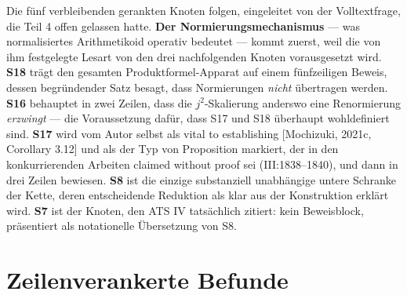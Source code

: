\documentclass[11pt,a4paper]{article}
\theoremstyle{definition}
\theoremstyle{remark}
\begin{document}
Die fünf verbleibenden gerankten Knoten folgen, eingeleitet von der
Volltextfrage, die Teil 4 offen gelassen hatte. \textbf{Der
Normierungsmechanismus} --- was \glqq normalisiertes Arithmetikoid\grqq{} operativ
bedeutet --- kommt zuerst, weil die von ihm festgelegte Lesart von den drei
nachfolgenden Knoten vorausgesetzt wird. \textbf{S18} trägt den gesamten
Produktformel-Apparat auf einem fünfzeiligen Beweis, dessen begründender
Satz besagt, dass Normierungen \emph{nicht} übertragen werden.
\textbf{S16} behauptet in zwei Zeilen, dass die $j^2$-Skalierung anderswo
eine Renormierung \emph{erzwingt} --- die Voraussetzung dafür, dass S17 und
S18 überhaupt wohldefiniert sind. \textbf{S17} wird vom Autor selbst als
\glqq vital to establishing [Mochizuki, 2021c, Corollary 3.12]\grqq{} und als der Typ
von Proposition markiert, der in den konkurrierenden Arbeiten \glqq claimed
without proof\grqq{} sei (III:1838--1840), und dann in drei Zeilen bewiesen.
\textbf{S8} ist die einzige substanziell unabhängige untere Schranke der
Kette, deren entscheidende Reduktion als klar aus der Konstruktion erklärt
wird. \textbf{S7} ist der Knoten, den ATS IV tatsächlich zitiert: kein
Beweisblock, präsentiert als notationelle Übersetzung von S8.

\section{Zeilenverankerte Befunde}\label{sec:findings}
\end{document}
